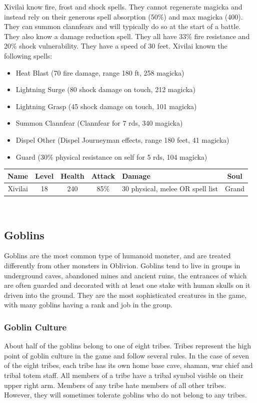 \documentclass[12pt]{book}
\begin{document}
Xivilai know fire, frost and shock spells. They cannot regenerate magicka and instead rely on their generous spell absorption (50\%) and max magicka (400). They can summon clannfears and will typically do so at the start of a battle. They also know a damage reduction spell. They all have 33\% fire resistance and 20\% shock vulnerability. They have a speed of 30 feet. Xivilai known the following spells:

\begin{itemize}
	\item Heat Blast (70 fire damage, range 180 ft, 258 magicka)
	\item Lightning Surge (80 shock damage on touch, 212 magicka)
	\item Lightning Grasp (45 shock damage on touch, 101 magicka)
	\item Summon Clannfear (Clannfear for 7 rds, 340 magicka)
	\item Dispel Other (Dispel Journeyman effects, range 180 feet, 41 magicka)
	\item Guard (30\% physical resistance on self for 5 rds, 104 magicka)
\end{itemize}

\begin{tabular}{|c|c|c|c|p{}|c|}
\hline
Name & Level & Health & Attack & Damage & Soul\\ \hline
Xivilai & 18 & 240 & 85\% & 30 physical, melee OR spell list & Grand\\ \hline
\end{tabular}\\

\subsection{Goblins}
Goblins are the most common type of humanoid monster, and are treated differently from other monsters in Oblivion. Goblins tend to live in groups in underground caves, abandoned mines and ancient ruins, the entrances of which are often guarded and decorated with at least one stake with human skulls on it driven into the ground. They are the most sophisticated creatures in the game, with many goblins having a rank and job in the group.

\subsubsection{Goblin Culture}

About half of the goblins belong to one of eight tribes. Tribes represent the high point of goblin culture in the game and follow several rules. In the case of seven of the eight tribes, each tribe has its own home base cave, shaman, war chief and tribal totem staff. All members of a tribe have a tribal symbol visible on their upper right arm. Members of any tribe hate members of all other tribes. However, they will sometimes tolerate goblins who do not belong to any tribes.
\end{document}

